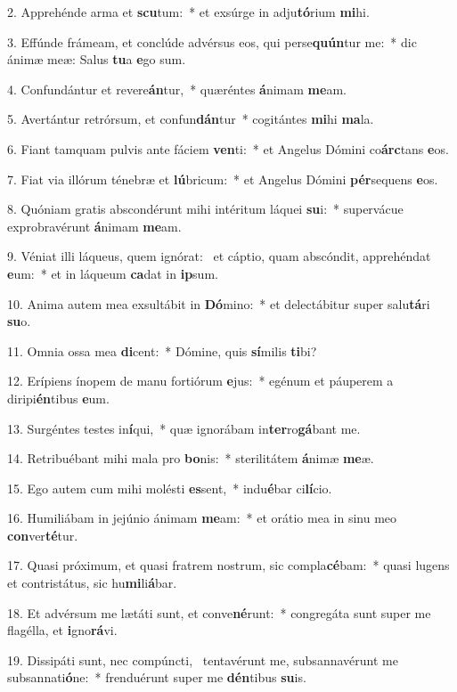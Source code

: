 2. Apprehénde arma et \textbf{scu}tum:~*  et exsúrge in adju\textbf{tó}rium \textbf{mi}hi.\

3. Effúnde frámeam, et conclúde advérsus eos, qui perse\textbf{quún}tur me:~*  dic ánimæ meæ: Salus \textbf{tu}a \textbf{e}go sum.\

4. Confundántur et revere\textbf{án}tur,~*  quæréntes \textbf{á}nimam \textbf{me}am.\

5. Avertántur retrórsum, et confun\textbf{dán}tur~*  cogitántes \textbf{mi}hi \textbf{ma}la.\

6. Fiant tamquam pulvis ante fáciem \textbf{ven}ti:~*  et Angelus Dómini co\textbf{árc}tans \textbf{e}os.\

7. Fiat via illórum ténebræ et \textbf{lú}bricum:~*  et Angelus Dómini \textbf{pér}sequens \textbf{e}os.\

8. Quóniam gratis abscondérunt mihi intéritum láquei \textbf{su}i:~*  supervácue exprobravérunt \textbf{á}nimam \textbf{me}am.\

9. Véniat illi láqueus, quem ignórat: \dag\  et cáptio, quam abscóndit, apprehéndat \textbf{e}um:~*  et in láqueum \textbf{ca}dat in \textbf{ip}sum.\

10. Anima autem mea exsultábit in \textbf{Dó}mino:~*  et delectábitur super salu\textbf{tá}ri \textbf{su}o.\

11. Omnia ossa mea \textbf{di}cent:~*  Dómine, quis \textbf{sí}milis \textbf{ti}bi?\

12. Erípiens ínopem de manu fortiórum \textbf{e}jus:~*  egénum et páuperem a diripi\textbf{én}tibus \textbf{e}um.\

13. Surgéntes testes in\textbf{í}qui,~*  quæ ignorábam in\textbf{ter}ro\textbf{gá}bant me.\

14. Retribuébant mihi mala pro \textbf{bo}nis:~*  sterilitátem \textbf{á}nimæ \textbf{me}æ.\

15. Ego autem cum mihi molésti \textbf{es}sent,~*  indu\textbf{é}bar ci\textbf{lí}cio.\

16. Humiliábam in jejúnio ánimam \textbf{me}am:~*  et orátio mea in sinu meo \textbf{con}ver\textbf{té}tur.\

17. Quasi próximum, et quasi fratrem nostrum, sic compla\textbf{cé}bam:~*  quasi lugens et contristátus, sic hu\textbf{mi}li\textbf{á}bar.\

18. Et advérsum me lætáti sunt, et conve\textbf{né}runt:~*  congregáta sunt super me flagélla, et \textbf{i}gno\textbf{rá}vi.\

19. Dissipáti sunt, nec compúncti, \dag\  tentavérunt me, subsannavérunt me subsannati\textbf{ó}ne:~*  frenduérunt super me \textbf{dén}tibus \textbf{su}is.\

